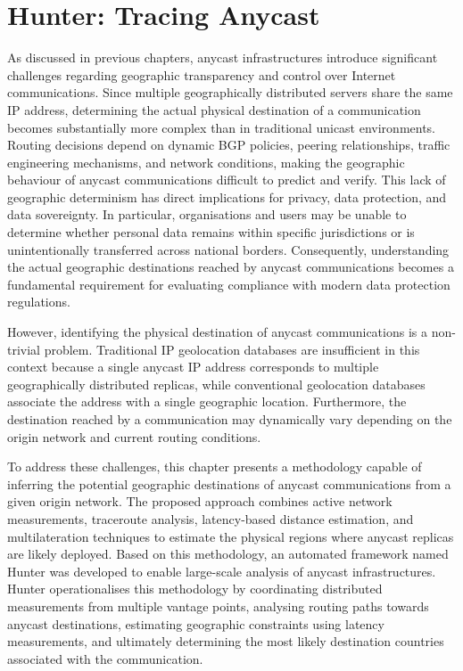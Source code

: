 \chapter{Hunter: Tracing Anycast}
\label{ch:hunter}

As discussed in previous chapters, anycast infrastructures introduce significant challenges regarding geographic transparency and control over Internet communications. Since multiple geographically distributed servers share the same IP address, determining the actual physical destination of a communication becomes substantially more complex than in traditional unicast environments. Routing decisions depend on dynamic BGP policies, peering relationships, traffic engineering mechanisms, and network conditions, making the geographic behaviour of anycast communications difficult to predict and verify. This lack of geographic determinism has direct implications for privacy, data protection, and data sovereignty. In particular, organisations and users may be unable to determine whether personal data remains within specific jurisdictions or is unintentionally transferred across national borders. Consequently, understanding the actual geographic destinations reached by anycast communications becomes a fundamental requirement for evaluating compliance with modern data protection regulations.

However, identifying the physical destination of anycast communications is a non-trivial problem. Traditional IP geolocation databases are insufficient in this context because a single anycast IP address corresponds to multiple geographically distributed replicas, while conventional geolocation databases associate the address with a single geographic location. Furthermore, the destination reached by a communication may dynamically vary depending on the origin network and current routing conditions.

To address these challenges, this chapter presents a methodology capable of inferring the potential geographic destinations of anycast communications from a given origin network. The proposed approach combines active network measurements, traceroute \cite{Traceroute8Page} analysis, latency-based distance estimation, and multilateration techniques to estimate the physical regions where anycast replicas are likely deployed. Based on this methodology, an automated framework named Hunter was developed to enable large-scale analysis of anycast infrastructures. Hunter operationalises this methodology by coordinating distributed measurements from multiple vantage points, analysing routing paths towards anycast destinations, estimating geographic constraints using latency measurements, and ultimately determining the most likely destination countries associated with the communication.

